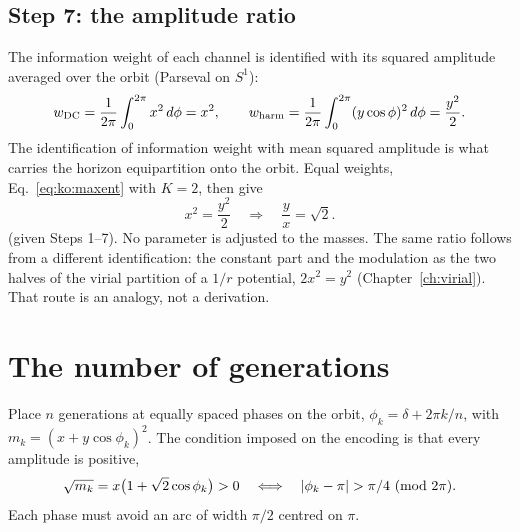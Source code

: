 \subsection{Step 7: the amplitude ratio}
The information weight of each channel is identified with its squared amplitude averaged over the orbit (Parseval on $S^1$):
\begin{equation}
w_{\rm DC}=\frac1{2\pi}\int_0^{2\pi}x^2\,d\phi=x^2,\qquad w_{\rm harm}=\frac1{2\pi}\int_0^{2\pi}(y\cos\phi)^2\,d\phi=\frac{y^2}{2}.\label{eq:ko:weights}
\end{equation}
The identification of information weight with mean squared amplitude is what carries the horizon equipartition onto the orbit.
\conjecture{} Equal weights, Eq.~\eqref{eq:ko:maxent} with $K=2$, then give
\begin{equation}
x^2=\frac{y^2}{2}\quad\Longrightarrow\quad\frac yx=\sqrt2.\label{eq:ko:ratio}
\end{equation}
\derived{} (given Steps 1--7). No parameter is adjusted to the masses. The same ratio follows from a different identification: the constant
part and the modulation as the two halves of the virial partition of a $1/r$ potential, $2x^2=y^2$ (Chapter~\ref{ch:virial}). That route is an
analogy, not a derivation. \analogy

\section{The number of generations}\label{sec:ko:count}
Place $n$ generations at equally spaced phases on the orbit, $\phi_k=\delta+2\pi k/n$, with $m_k=(x+y\cos\phi_k)^2$. The condition imposed on the
encoding is that every amplitude is positive,
\begin{equation}
\sqrt{m_k}=x\big(1+\sqrt2\cos\phi_k\big)>0\quad\Longleftrightarrow\quad|\phi_k-\pi|>\pi/4\ ({\rm mod}\ 2\pi).\label{eq:ko:pos}
\end{equation}
Each phase must avoid an arc of width $\pi/2$ centred on $\pi$. \derived


